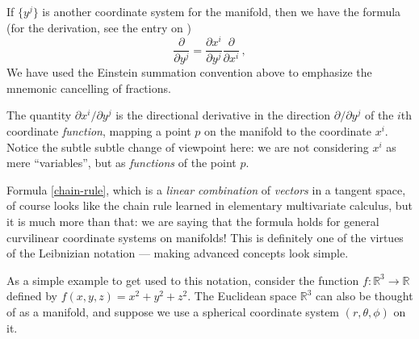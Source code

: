 \documentclass[12pt]{article}
\newcommand{\real}{\mathbb{R}}
\begin{document}
If $\{ y^j \}$ is another coordinate system for the manifold,
then we have the formula (for the derivation, see the entry on 
)
\begin{equation}\label{chain-rule}
\frac{\partial}{\partial y^j} = \frac{\partial x^i}{\partial y^j} \frac{\partial}{\partial x^i}\,,
\end{equation}
We have used the Einstein
summation convention above to emphasize the mnemonic cancelling of fractions.

The quantity $\partial x^i/\partial y^j$
is the directional derivative in the direction $\partial / \partial y^j$
of the $i$th coordinate \emph{function}, mapping a point $p$ on the manifold to 
the coordinate $x^i$.  Notice the subtle subtle change of 
viewpoint here:
we are not considering $x^i$ as mere ``variables'',
but as \emph{functions} of the point $p$.

Formula \eqref{chain-rule}, which is a \emph{linear combination} of \emph{vectors}
in a tangent space, 
of course looks like the chain rule learned in elementary multivariate
calculus, 
but it is much more than that:
we are saying that the formula holds for general curvilinear coordinate systems on manifolds!
This is definitely one of the virtues of the Leibnizian notation --- making advanced concepts
look simple.

As a simple example to get used to this notation,
consider the function $f\colon \real^3 \to \real$
defined by $f(x, y, z) = x^2 + y^2 + z^2$.
The Euclidean space $\real^3$ can also be thought of as a manifold,
and suppose we use a spherical coordinate system $(r, \theta, \phi)$ on it.
\end{document}
